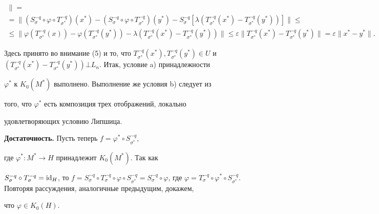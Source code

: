 \begin{pf}
\begin{gather*}
[(S^{-q}_{\sigma^*}\circ T^{-q}_{\sigma^*})(x^*)- 


(S^{-q}_{\sigma^*}\circ T^{-q}_{\sigma^*})(y^*)]\| = \\ 


% 


=\|(S^{-q}_\sigma\circ\varphi\circ T^{-q}_{\sigma^*})(x^*)- 


(S^{-q}_\sigma\circ\varphi\circ T^{-q}_{\sigma^*})(y^*)- 


S^{-q}_\sigma[\lambda(T^{-q}_{\sigma^*}(x^*)- 


T^{-q}_{\sigma^*}(y^*))]\|\le \\ 


% 


\le \|\varphi(T^{-q}_{\sigma^*}(x))-\varphi 


(T^{-q}_{\sigma^*}(y^*))-\lambda(T^{-q}_{\sigma^*}(x^*)- 


T^{-q}_{\sigma^*}(y^*))\|\le 


\varepsilon\|T^{-q}_{\sigma^*}(x^*)- 


T^{-q}_{\sigma^*}(y^*)\|=\varepsilon\|x^*-y^*\|. 


\end{gather*} 


Здесь принято во внимание (5) и то, что $T^{-q}_{\sigma^*}(x^*), 


T^{-q}_{\sigma^*}(y^*)\in U$ и $(T^{-q}_{\sigma^*}(x^*)- 


T^{-q}_{\sigma^*}(y^*))\bot L_n$. Итак, условие a) принадлежности 


$\varphi^*$ к $K_0(M^*)$ выполнено. Выполнение же условия b) следует из 


того, что $\varphi^*$ есть композиция трех отображений, локально 


удовлетворяющих условию Липшица. 


\medskip 


 


{\bf Достаточность.} Пусть теперь $f=\varphi^*\circ S^{-q}_{\sigma^*}$, 


где $\varphi^*:M^*\to H$ принадлежит $K_0(M^*)$. Так как 


$S^{-q}_\sigma\circ T^{-q}_\sigma=\id_H$, то $f=S^{-q}_\sigma\circ 


T^{-q}_\sigma\circ\varphi\circ S^{-q}_{\sigma^*}= 


S^{-q}_\sigma\circ\varphi$, где $\varphi=T^{-q}_\sigma\circ\varphi^*\circ 


S^{-q}_{\sigma^*}$. Повторяя рассуждения, аналогичные предыдущим, докажем, 


что $\varphi\in K_0(H)$. 


\end{pf} 


